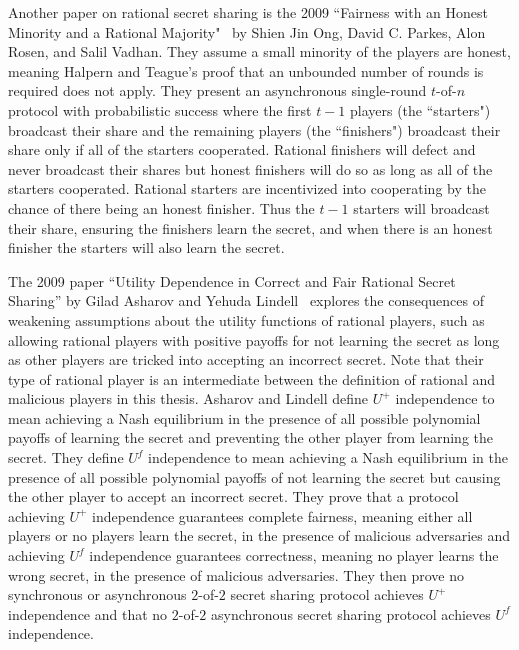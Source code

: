 \documentclass[12pt]{dalcsthesis}
\begin{document}
Another paper on rational secret sharing is the 2009 ``Fairness with an Honest Minority and a Rational Majority"~\cite{ong09} by Shien Jin Ong, David C. Parkes, Alon Rosen, and Salil Vadhan. They assume a small minority of the players are honest, meaning Halpern and Teague's proof that an unbounded number of rounds is required does not apply. They present an asynchronous single-round $t$-of-$n$ protocol with probabilistic success where the first $t-1$ players (the ``starters") broadcast their share and the remaining players (the ``finishers") broadcast their share only if all of the starters cooperated. Rational finishers will defect and never broadcast their shares but honest finishers will do so as long as all of the starters cooperated. Rational starters are incentivized into cooperating by the chance of there being an honest finisher. Thus the $t-1$ starters will broadcast their share, ensuring the finishers learn the secret, and when there is an honest finisher the starters will also learn the secret.

The 2009 paper ``Utility Dependence in Correct and Fair Rational Secret Sharing'' by Gilad Asharov and Yehuda Lindell~\cite{asharov09} explores the consequences of weakening assumptions about the utility functions of rational players, such as allowing rational players with positive payoffs for not learning the secret as long as other players are tricked into accepting an incorrect secret. Note that their type of rational player is an intermediate between the definition of rational and malicious players in this thesis. Asharov and Lindell define $U^{+}$ independence to mean achieving a Nash equilibrium in the presence of all possible polynomial payoffs of learning the secret and preventing the other player from learning the secret. They define $U^f$ independence to mean achieving a Nash equilibrium in the presence of all possible polynomial payoffs of not learning the secret but causing the other player to accept an incorrect secret. They prove that a protocol achieving $U^{+}$ independence guarantees complete fairness, meaning either all players or no players learn the secret, in the presence of malicious adversaries and achieving $U^f$ independence guarantees correctness, meaning no player learns the wrong secret, in the presence of malicious adversaries. They then prove no synchronous or asynchronous $2$-of-$2$ secret sharing protocol achieves $U^{+}$ independence and that no $2$-of-$2$ asynchronous secret sharing protocol achieves $U^f$ independence.
\end{document}
